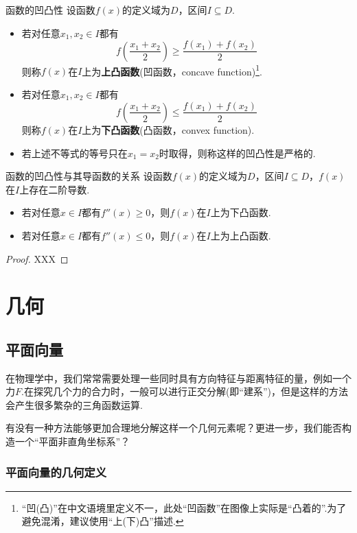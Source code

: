 \documentclass[lang=cn, zihao=5]{elegantbook}
\newcommand{\ssb}[1]{\left( #1 \right)}
\begin{document}
\begin{definition}{函数的凹凸性}
	设函数$f(x)$的定义域为$D$，区间$I \subseteq D$.
	\begin{itemize}
		\item 若对任意$x_1,x_2 \in I$都有$$f\ssb{\frac{x_1+x_2}{2}} \geq \frac{f(x_1)+f(x_2)}{2}$$则称$f(x)$在$I$上为\textbf{上凸函数}(凹函数，concave function)\footnote{“凹(凸)”在中文语境里定义不一，此处“凹函数”在图像上实际是“凸着的”.为了避免混淆，建议使用“上(下)凸”描述.}.
		\item 若对任意$x_1,x_2 \in I$都有$$f\ssb{\frac{x_1+x_2}{2}} \leq \frac{f(x_1)+f(x_2)}{2}$$则称$f(x)$在$I$上为\textbf{下凸函数}(凸函数，convex function).
		\item 若上述不等式的等号只在$x_1=x_2$时取得，则称这样的凹凸性是严格的.
	\end{itemize}
\end{definition}

\begin{theorem}{函数的凹凸性与其导函数的关系}
	设函数$f(x)$的定义域为$D$，区间$I \subseteq D$，$f(x)$在$I$上存在二阶导数.
	\begin{itemize}
		\item 若对任意$x \in I$都有$f''(x) \geq 0$，则$f(x)$在$I$上为下凸函数.
		\item 若对任意$x \in I$都有$f''(x) \leq 0$，则$f(x)$在$I$上为上凸函数.
	\end{itemize}
\end{theorem}
\begin{proof}
	XXX
\end{proof}

\part{几何}

\chapter{平面向量}

在物理学中，我们常常需要处理一些同时具有方向特征与距离特征的量，例如一个力$F$.在探究几个力的合力时，一般可以进行正交分解(即“建系”)，但是这样的方法会产生很多繁杂的三角函数运算.

有没有一种方法能够更加合理地分解这样一个几何元素呢？更进一步，我们能否构造一个“平面非直角坐标系”？

\section{平面向量的几何定义}
\end{document}
